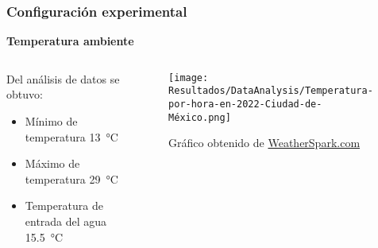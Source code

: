 	\begin{frame}
	    \frametitle{Configuración experimental}
	    \vspace*{2mm}
	    
	    \textbf{\large Temperatura ambiente}\\[5mm]
	    
	    \begin{columns}
			\begin{column}{0.5\textwidth}
				Del análisis de datos se obtuvo:
			    \begin{itemize}
			    		\item Mínimo de temperatura \qty{13}{\degreeCelsius}
			    		\item Máximo de temperatura \qty{29}{\degreeCelsius}
			    		\item Temperatura de entrada del agua \qty{15.5}{\degreeCelsius}
			    \end{itemize}
		    \end{column}
		    \begin{column}{0.5\textwidth}
			    \centering
		    		\begin{figure}
		    			\centering
		    			\texttt{[image: Resultados/DataAnalysis/Temperatura-por-hora-en-2022-Ciudad-de-México.png]}
		    			\caption{Gráfico obtenido de \href{https://es.weatherspark.com/y/5674/Clima-promedio-en-Ciudad-de-México-México-durante-todo-el-año}{\textcopyright WeatherSpark.com}}
		    			\label{fig:Temperatura-por-hora-en-2022-Ciudad-de-México}
		    		\end{figure}
		    \end{column}
	    \end{columns}
	\end{frame}
	
